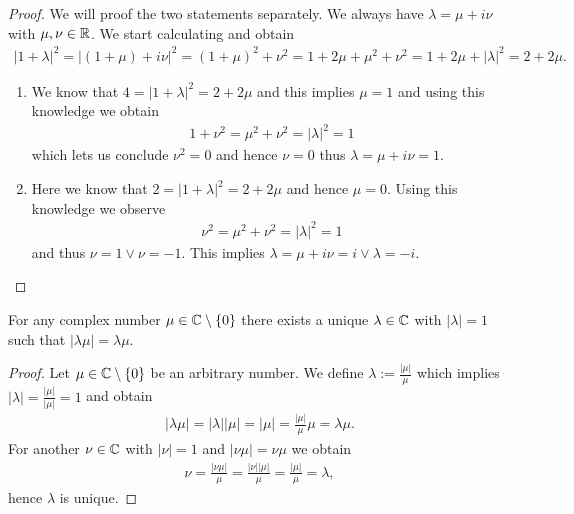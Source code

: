 \begin{proof}
	We will proof the two statements separately. We always have $\lambda = \mu + i \nu$ with $\mu, \nu \in \mathbb{R}$. We start calculating and obtain
	\begin{align*}
		|1 + \lambda|^2 = |(1 + \mu) + i \nu|^2 = (1 + \mu)^2 + \nu^2 = 1 + 2\mu + \mu^2 + \nu^2 = 1 + 2\mu + |\lambda|^2 = 2 + 2 \mu.
	\end{align*}
	\begin{enumerate}
		\item We know that $4 = |1 + \lambda|^2 = 2 + 2\mu$ and this implies $\mu = 1$ and using this knowledge we obtain
		\begin{align*}
			1 + \nu^2 = \mu^2 + \nu^2 = |\lambda|^2 = 1
		\end{align*}
		which lets us conclude $\nu^2 = 0$ and hence $\nu = 0$ thus $\lambda = \mu + i \nu = 1$. 
		
		\item Here we know that $2 = |1 + \lambda|^2 = 2 + 2\mu$ and hence $\mu = 0$. Using this knowledge we observe
		\begin{align*}
			\nu^2 = \mu^2 + \nu^2 = |\lambda|^2 = 1
		\end{align*}
		and thus $\nu = 1 \lor \nu = -1$. This implies $\lambda = \mu + i \nu = i \lor \lambda = -i$.  
	\end{enumerate}
\end{proof}

\begin{lemma} \label{lemma:phase_adjustment_complex}
	For any complex number $\mu \in \mathbb{C} \setminus \{0\}$ there exists a unique $\lambda \in \mathbb{C}$ with $|\lambda| = 1$ such that $|\lambda \mu| = \lambda \mu$. 
\end{lemma}

\begin{proof}
	Let $\mu \in \mathbb{C} \setminus \{0\}$ be an arbitrary number. We define $\lambda := \frac{|\mu|}{\mu}$ which implies $|\lambda| = \frac{|\mu|}{|\mu|} = 1$ and obtain
	\begin{align*}
		|\lambda \mu| = |\lambda| |\mu| = |\mu| = \frac{|\mu|}{\mu} \mu = \lambda \mu.
	\end{align*}
	For another $\nu \in \mathbb{C}$ with $|\nu| = 1$ and $|\nu \mu| = \nu \mu$ we obtain
	\begin{align*}
		\nu = \frac{|\nu \mu|}{\mu} = \frac{|\nu| |\mu|}{\mu} = \frac{|\mu|}{\mu} = \lambda,
	\end{align*}
	hence $\lambda$ is unique. 
\end{proof}

